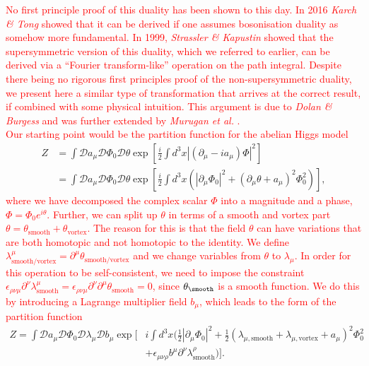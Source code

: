 \begin{table}
        \label{table:PV_Duality}
    \end{table}

 \textcolor{red}{No first principle proof of this duality has been shown to this day. In 2016 \textit{Karch \& Tong} \cite{Karch:2016sxi} showed that it can be derived if one assumes bosonisation duality as somehow more fundamental. In 1999, \textit{Strassler \& Kapustin} \cite{Kapustin:1999ha} showed that the supersymmetric version of this duality, which we referred to earlier, can be derived via a ``Fourier transform-like'' operation on the path integral. Despite there being no rigorous first principles proof of the non-supersymmetric duality, we present here a similar type of transformation that  arrives at the correct result, if combined with some physical intuition. This argument is due to \textit{Dolan \& Burgess} \cite{Burgess:2000kj} and was further extended by \textit{Murugan et al.} \cite{Murugan:2014sfa} . } \\
\indent \textcolor{red}{Our starting point would be the partition function for the abelian Higgs model}
\begin{align}
    Z&= \int \mathcal{D}a_{\mu} \mathcal{D}\Phi_0 \mathcal{D} \theta \exp\left[\frac{i}{2} \int d^3x |(\partial_{\mu} -i a_{\mu}) \Phi |^2 \right]\\
    &= \int \mathcal{D}a_{\mu} \mathcal{D}\Phi_0 \mathcal{D} \theta \exp\left[ \frac{i}{2} \int d^3x \left( |\partial_{\mu}\Phi_0 |^2 + \left(\partial_{\mu}\theta +  a_{\mu} \right)^2\Phi_0^2 \right) \right],
\end{align}
\textcolor{red}{where we have decomposed the complex scalar $\Phi$ into a magnitude and a phase, $\Phi = \Phi_0 e^{i \theta}$. Further, we can split up $\theta$ in terms of a smooth and vortex part $\theta = \theta_{\text{smooth}} + \theta_{\text{vortex}}$. The reason for this is that the field $\theta$ can have variations that are both homotopic and not homotopic to the identity.  We define $\lambda^{\mu}_{\text{smooth/vortex}} =\partial^{\mu} \theta_{\text{smooth/vortex}}$ and we change variables from $\theta$ to $\lambda_{\mu}$. In order for this operation to be self-consistent, we need to impose the constraint $\epsilon_{\rho \nu \mu} \partial^{\nu} \lambda^{\mu}_{\text{smooth}}=\epsilon_{\rho \nu \mu} \partial^{\nu} \partial^{\mu} \theta_{\text{smooth}}=0$, since $\theta_{\text{\smooth}}$ is a smooth function. We do this by introducing a Lagrange multiplier field $b_{\mu}$, which leads to the form of the partition function}
\begin{align}
    Z= \int \mathcal{D}a_{\mu} \mathcal{D}\Phi_0 \mathcal{D} \lambda_{\mu} \mathcal{D} b_{\mu} \exp\bigg[&i \int d^3x \bigg( \frac{1}{2}|\partial_{\mu}\Phi_0 |^2 + \frac{1}{2}\left(\lambda_{\mu,\text{smooth}}+\lambda_{\mu,\text{vortex}} +  a_{\mu} \right)^2\Phi_0^2 \nonumber \\
    &+ \epsilon_{\mu \nu \rho} b^{\mu} \partial^{\nu} \lambda^{\rho}_{\text{smooth}} \bigg) \bigg].
\end{align}
